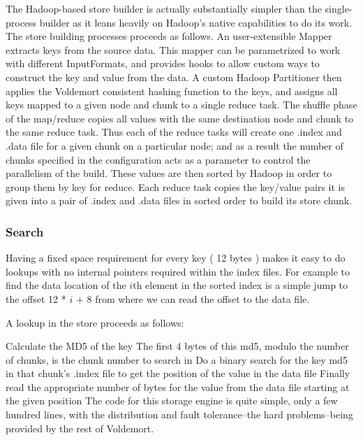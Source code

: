 \documentclass[10pt,twocolumn,preprint,natbib,authoryear]{sigplanconf}
\begin{document}
The Hadoop-based store builder is actually substantially simpler than the single-process builder as it leans heavily on Hadoop’s native capabilities to do its work. The store building processes proceeds as follows. An user-extensible Mapper extracts keys from the source data. This mapper can be parametrized to work with different InputFormats, and provides hooks to allow custom ways to construct the key and value from the data. A custom Hadoop Partitioner then applies the Voldemort consistent hashing function to the keys, and assigns all keys mapped to a given node and chunk to a single reduce task. The shuffle phase of the map/reduce copies all values with the same destination node and chunk to the same reduce task. Thus each of the reduce tasks will create one .index and .data file for a given chunk on a particular node; and as a result the number of chunks specified in the configuration acts as a parameter to control the parallelism of the build. These values are then sorted by Hadoop in order to group them by key for reduce. Each reduce task copies the key/value pairs it is given into a pair of .index and .data files in sorted order to build its store chunk.

\subsubsection{Search}

Having a fixed space requirement for every key ( 12 bytes ) makes it easy to do lookups with no internal pointers required within the index files. For example to find the data location of the $i$th element in the sorted index is a simple jump to the offset 12 * $i$ + 8 from where we can read the offset to the data file.

A lookup in the store proceeds as follows:

Calculate the MD5 of the key
The first 4 bytes of this md5, modulo the number of chunks, is the chunk number to search in
Do a binary search for the key md5 in that chunk’s .index file to get the position of the value in the data file
Finally read the appropriate number of bytes for the value from the data file starting at the given position
The code for this storage engine is quite simple, only a few hundred lines, with the distribution and fault tolerance–the hard problems–being provided by the rest of Voldemort.
\end{document}
